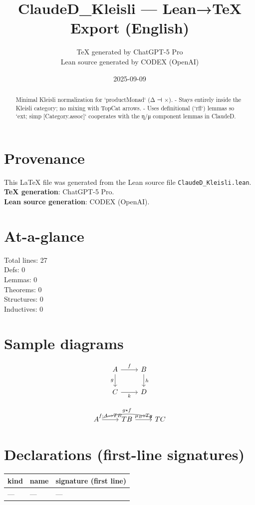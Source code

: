 \documentclass[12pt]{article}
\title{ClaudeD\_Kleisli — Lean→TeX Export (English)}
\author{TeX generated by ChatGPT-5 Pro\\Lean source generated by CODEX (OpenAI)}
\date{2025-09-09}
\begin{document}
\maketitle

\begin{abstract}
Minimal Kleisli normalization for `productMonad` (Δ ⊣ ×).
  - Stays entirely inside the Kleisli category; no mixing with TopCat arrows.
  - Uses definitional (`rfl`) lemmas so `ext; simp [Category.assoc]` cooperates
    with the η/μ component lemmas in ClaudeD.
\end{abstract}

\section*{Provenance}
This \LaTeX{} file was generated from the Lean source file \texttt{ClaudeD\_Kleisli.lean}.\\
\textbf{TeX generation}: ChatGPT-5 Pro.\\
\textbf{Lean source generation}: CODEX (OpenAI).

\section*{At-a-glance}
Total lines: 27\\
Defs: 0\\
Lemmas: 0\\
Theorems: 0\\
Structures: 0\\
Inductives: 0

\section*{Sample diagrams}

\[
\begin{tikzcd}
A \arrow[r, "f"] \arrow[d, "g"'] & B \arrow[d, "h"] \\
C \arrow[r, "k"'] & D
\end{tikzcd}
\]



\[
\begin{tikzcd}
A \arrow[r, "f: A \to TB"] \arrow[rr, bend left=15, "{g \star f}"] & TB \arrow[r, "{\mu_B \circ T g}"] & TC
\end{tikzcd}
\]


\section*{Declarations (first-line signatures)} 
\begin{center}
\begin{tabular}{lll}
\textbf{kind} & \textbf{name} & \textbf{signature (first line)} \\ \hline
— & — & — \\
\end{tabular}
\end{center}
\end{document}
